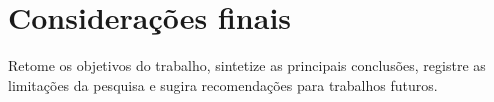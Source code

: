 \chapter{Considerações finais}
Retome os objetivos do trabalho, sintetize as principais conclusões, registre as limitações da pesquisa e sugira recomendações para trabalhos futuros.
